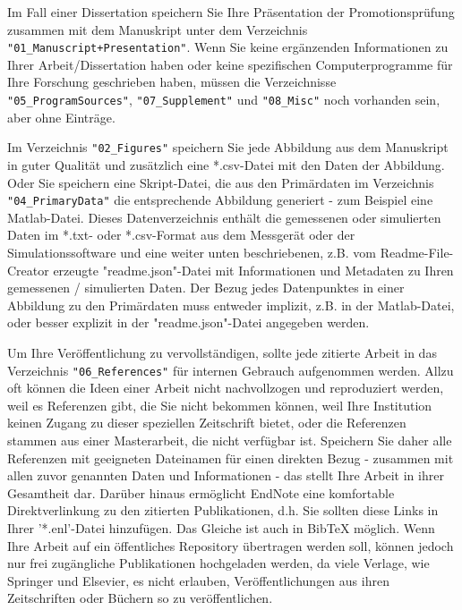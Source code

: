 Im Fall einer Dissertation speichern Sie Ihre Präsentation der Promotionsprüfung
zusammen mit dem Manuskript unter dem Verzeichnis
\texttt{"01\_Manuscript+Presentation"}. Wenn Sie keine ergänzenden Informationen
zu Ihrer Arbeit/Dissertation haben oder keine spezifischen Computerprogramme für
Ihre Forschung geschrieben haben, müssen die Verzeichnisse
\texttt{"05\_ProgramSources"}, \texttt{"07\_Supplement"} und \texttt{"08\_Misc"}
noch vorhanden sein, aber ohne Einträge.

Im Verzeichnis \texttt{"02\_Figures"} speichern Sie jede Abbildung aus dem
Manuskript in guter Qualität und zusätzlich eine *.csv-Datei mit den Daten der
Abbildung. Oder Sie speichern eine Skript-Datei, die aus den Primärdaten im
Verzeichnis \texttt{"04\_PrimaryData"} die entsprechende Abbildung generiert -
zum Beispiel eine Matlab-Datei. Dieses Datenverzeichnis enthält die gemessenen
oder simulierten Daten im *.txt- oder *.csv-Format aus dem Messgerät oder der
Simulationssoftware und eine weiter unten beschriebenen, z.B. vom
Readme-File-Creator erzeugte "readme.json"-Datei mit Informationen und Metadaten
zu Ihren gemessenen / simulierten Daten. Der Bezug jedes Datenpunktes in einer
Abbildung zu den Primärdaten muss entweder implizit, z.B. in der Matlab-Datei,
oder besser explizit in der "readme.json"-Datei angegeben werden.

Um Ihre Veröffentlichung zu vervollständigen, sollte jede zitierte Arbeit in das
Verzeichnis \texttt{"06\_References"} für internen Gebrauch aufgenommen werden.
Allzu oft können die Ideen einer Arbeit nicht nachvollzogen und reproduziert
werden, weil es Referenzen gibt, die Sie nicht bekommen können, weil Ihre
Institution keinen Zugang zu dieser speziellen Zeitschrift bietet, oder die
Referenzen stammen aus einer Masterarbeit, die nicht verfügbar ist. Speichern
Sie daher alle Referenzen mit geeigneten Dateinamen für einen direkten Bezug -
zusammen mit allen zuvor genannten Daten und Informationen - das stellt Ihre
Arbeit in ihrer Gesamtheit dar. Darüber hinaus ermöglicht EndNote eine
komfortable Direktverlinkung zu den zitierten Publikationen, d.h. Sie sollten
diese Links in Ihrer '*.enl'-Datei hinzufügen. Das Gleiche ist auch in BibTeX
möglich. Wenn Ihre Arbeit auf ein öffentliches Repository übertragen werden
soll, können jedoch nur frei zugängliche Publikationen hochgeladen werden, da
viele Verlage, wie Springer und Elsevier, es nicht erlauben, Veröffentlichungen
aus ihren Zeitschriften oder Büchern so zu veröffentlichen.

